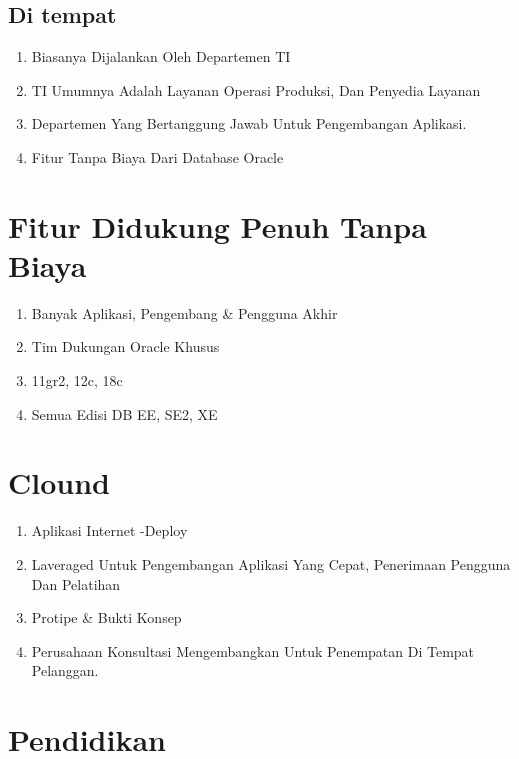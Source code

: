 \documentclass{article}
\begin{document}
    \subsection{Di tempat}
    \begin{enumerate}
        \item Biasanya Dijalankan Oleh Departemen TI
         \item TI Umumnya Adalah Layanan Operasi Produksi, Dan Penyedia Layanan
        \item Departemen Yang Bertanggung Jawab Untuk Pengembangan Aplikasi.
        \item Fitur Tanpa Biaya Dari Database Oracle
    \end{enumerate}
    
    \section{Fitur Didukung Penuh Tanpa Biaya}
    \begin{enumerate}
        \item Banyak Aplikasi, Pengembang & Pengguna Akhir
    \item Tim Dukungan Oracle Khusus
    \item 11gr2, 12c, 18c
    \item Semua Edisi DB EE, SE2, XE

    \end{enumerate}
    
    \section{Clound}
    \begin{enumerate}
    \item Aplikasi Internet -Deploy
    \item Laveraged Untuk Pengembangan Aplikasi Yang Cepat, Penerimaan Pengguna Dan Pelatihan
    \item Protipe & Bukti Konsep
    \item Perusahaan Konsultasi Mengembangkan Untuk Penempatan Di Tempat Pelanggan.

    \end{enumerate}

\section{Pendidikan}
\usepackage{Apakah Anda Seorang Siswa Atau Guru SQL, Database Relasional, atau Pengembangan Aplikasi, Anda Dapat Menggunakan Oracle Apex Untuk Sangat Memperkaya Pengalaman Pendidikan Anda?}
\end{document}
